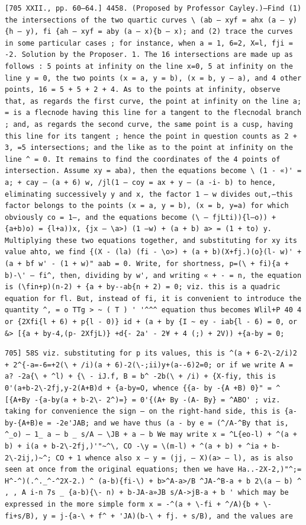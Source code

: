 \documentclass[12pt]{article}
\theoremstyle{plain}
\begin{document}
\newpage
\setcounter{page}{582}
\begin{verbatim}
[705 XXII., pp. 60—64.] 4458. (Proposed by Professor Cayley.)—Find (1) the intersections of the two quartic curves \ (ab — xyf = ahx (a — y){h — y), fi {ah — xyf = aby (a — x){b — x); and (2) trace the curves in some particular cases ; for instance, when a = 1, 6=2, X=l, fji = -2. Solution by the Proposer. 1. The 16 intersections are made up as follows : 5 points at infinity on the line x=0, 5 at infinity on the line y = 0, the two points (x = a, y = b), (x = b, y — a), and 4 other points, 16 = 5 + 5 + 2 + 4. As to the points at infinity, observe that, as regards the first curve, the point at infinity on the line a; = is a flecnode having this line for a tangent to the flecnodal branch ; and, as regards the second curve, the same point is a cusp, having this line for its tangent ; hence the point in question counts as 2 + 3, =5 intersections; and the like as to the point at infinity on the line ^ = 0. It remains to find the coordinates of the 4 points of intersection. Assume xy = aba), then the equations become \ (1 - «)' = a; + cay — (a + 6) w, /jl(1 — coy = ax + y — (a -i- b) to hence, eliminating successively y and x, the factor 1 — w divides out,—this factor belongs to the points (x = a, y = b), (x = b, y=a) for which obviously co = 1—, and the equations become (\ — fjLti)){l—o)) + {a+b)o) = {l+a))x, {jx — \a>) (1 —w) + (a + b) a> = (1 + to) y. Multiplying these two equations together, and substituting for xy its value ahto, we find {(X - (la) (fi - \o>) + (a + b)(X+fj.)(o}(l- w)' + (a + bf w' - (1 + w)" aab = 0. Write, for shortness, p=(\ + fi){a + b)-\' — fi^, then, dividing by w', and writing « + - = n, the equation is (\fin+p)(n-2) + {a + by--ab{n + 2) = 0; viz. this is a quadric equation for fl. But, instead of fi, it is convenient to introduce the quantity ^, = o TTg > ~ ( T ) ' '^^^ equation thus becomes Wlil+P 40 4 or {2Xfi{l + 6) + p{l - 0)} id + (a + by {I ~ ey - iab{l - 6) = 0, or &> [{a + by-4,(p- 2XfjL)} +d{- 2a' - 2¥ + 4 (;) + 2V)) +{a-by = 0; 
\end{verbatim}

\newpage
\setcounter{page}{583}
\begin{verbatim}
705] 58S viz. substituting for p its values, this is ^(a + 6-2\-2/i)2 + 2^{-a=-6=+2(\ + /i)(a + 6)-2(\-;ii)y+(a--6)2=0; or if we write A = a? -2a{\ + ^l) + {\ - iJ.f, B = b^ -2b(\ + /i) + {X-fiy, this is 0'(a+b-2\-2fj,y-2(A+B)d + {a-by=O, whence {{a- by -{A +B) 0}" = ^ [{A+By -{a-by(a + b-2\- 2^)=} = 0'{(A+ By -(A- By} = ^ABO' ; viz. taking for convenience the sign — on the right-hand side, this is {a-by-{A+B)e = -2e'JAB; and we have thus (a - by e = (^/A-^By that is, ^_o) — 1_ a — b _ s/A — \JB + a — b We may write x = ^L{eo-l) + ^(a + b) + i(a + b-2\-2fj,)'"~^\, CO -\y = \(m-l) + ^(a + b) + ^ia + b-2\-2ij,)~^; CO + 1 whence also x — y = (jj, — X)(a> — l), as is also seen at once from the original equations; then we have Ha..-2X-2,)"^;= H^-^)(.^._^-^2X-2.) ^ (a-b){fi-\) + b>^A-a>/B ^JA-^B-a + b 2\(a — b) ^ , , A i-n 7s _ {a-b){\- n) + b-JA-a»JB s/A->jB-a + b ' which may be expressed in the more simple form x = -^(a + \-fi + ^/A){b + \-fi+s/B), y = j-{a-\ + f^ + 'JA)(b-\ + fj. + s/B), and the values are 
\end{verbatim}
\end{document}

